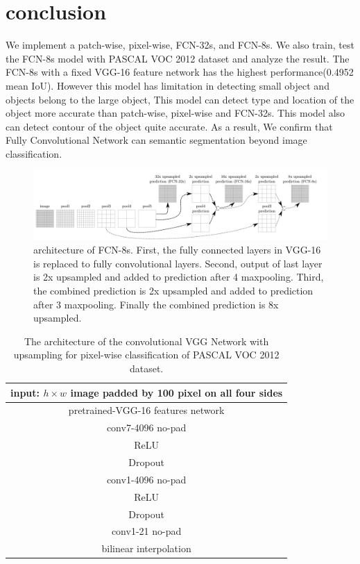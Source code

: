 \documentclass[extendedabs]{bmvc2k}
\begin{document}
\section{conclusion}
We implement a patch-wise, pixel-wise, FCN-32s, and FCN-8s. We also train, test the FCN-8s model with PASCAL VOC 2012 dataset and analyze the result. The FCN-8s with a fixed VGG-16 feature network has the highest performance(0.4952 mean IoU). However this model has limitation in detecting small object and objects belong to the large object, This model can detect type and location of the object more accurate than patch-wise, pixel-wise and FCN-32s. This model also can detect contour of the object quite accurate. As a result, We confirm that Fully Convolutional Network can semantic segmentation beyond image classification.
\begin{figure}[t]
	\includegraphics[width=\linewidth]{images/fig4.png}
	\caption{
		architecture of FCN-8s. First, the fully connected layers in VGG-16 is replaced to fully convolutional layers. Second, output of last layer is 2x upsampled and added to prediction after 4 maxpooling. Third, the combined prediction is 2x upsampled and added to prediction after 3 maxpooling. Finally the combined prediction is 8x upsampled. }
        \label{fig:fcn-8sarch}
	\vspace{-2mm}
\end{figure}

\begin{table}[]
\centering
\begin{tabular}{|c|}
\hline
input:  $h \times w$ image padded by 100 pixel on all four sides \\ \hline
pretrained-VGG-16 features network                    \\ \hline
conv7-4096 no-pad                                     \\ \hline
ReLU                                                  \\ \hline
Dropout                                               \\ \hline
conv1-4096 no-pad                                     \\ \hline
ReLU                                                  \\ \hline
Dropout                                               \\ \hline
conv1-21 no-pad                                       \\ \hline
bilinear interpolation                                \\ \hline
\end{tabular}
\caption{The architecture of the convolutional VGG Network with upsampling for pixel-wise classification of PASCAL VOC 2012 dataset.}
\label{tab:bilinearvgg}
\end{table}
\end{document}
